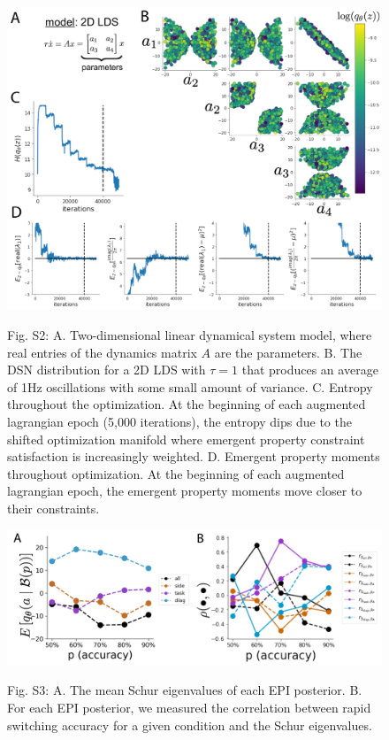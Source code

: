\documentclass[11pt]{article}
\begin{document}
\begin{figure}
\begin{center}
\includegraphics[scale=0.5]{figs/figS2/figS2.pdf}
\end{center}
Fig. S2: A. Two-dimensional linear dynamical system model, where real entries of the dynamics matrix $A$ are the parameters.  B. The DSN distribution for a 2D LDS with $\tau=1$ that produces an average of 1Hz oscillations with some small amount of variance.  C. Entropy throughout the optimization.  At the beginning of each augmented lagrangian epoch (5,000 iterations), the entropy dips due to the shifted optimization manifold where emergent property constraint satisfaction is increasingly weighted.  D. Emergent property moments throughout optimization.  At the beginning of each augmented lagrangian epoch, the emergent property moments move closer to their constraints.
\end{figure}


\begin{figure}
\begin{center}
\includegraphics[scale=0.5]{figs/figS3/figS3.pdf}
\end{center}
Fig. S3: A. The mean Schur eigenvalues of each EPI posterior. B. For each EPI posterior, we measured the correlation between rapid switching accuracy for a given condition and the Schur eigenvalues.
\end{figure}
\end{document}
